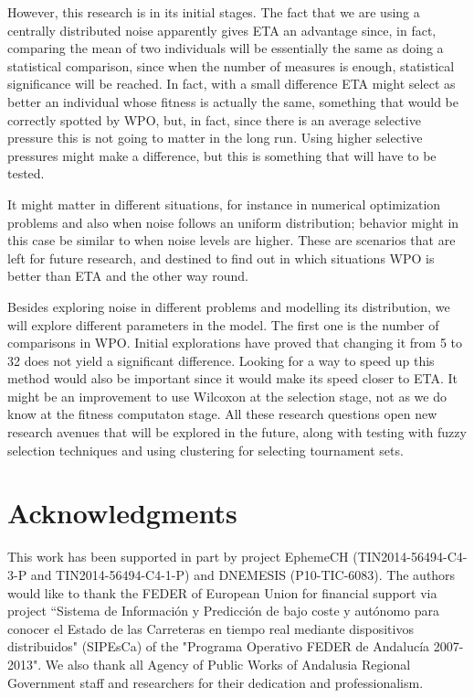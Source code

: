 \documentclass{svmult}
\begin{document}
However, this research is in its initial stages. 
The fact that we are
using a centrally distributed noise apparently gives ETA an advantage since, in
fact, comparing the mean of two individuals will be essentially the
same as doing a statistical comparison, since when the number of
measures is enough, statistical significance will be reached. In fact,
with a small difference ETA might select as better an individual whose
fitness is actually the same, something that would be correctly
spotted by WPO, but, in fact, since there is an average selective
pressure this is not going to matter in the long run. Using higher
selective pressures might make a difference, but this is something
that will have to be tested. 

It might matter in different situations, for instance in numerical
optimization problems and also when noise follows an uniform
distribution; behavior might in this case be similar to when noise
levels are higher. These are scenarios that are left for future
research, and destined to find out in which situations WPO is better
than ETA and the other way round. 

Besides exploring noise in different problems and modelling its
distribution, we will explore different parameters in the model. The first one is the number of comparisons in WPO. Initial
explorations have proved that changing it from 5 to 32 does not yield
a significant difference. Looking for a way to speed up this method
would also be important since it would make its speed closer to
ETA. It might be an improvement to use Wilcoxon at the selection
stage, not as we do know at the fitness computaton stage. All these
research questions open new research avenues that will be explored in
the future, along with testing with fuzzy selection techniques and
using clustering for selecting tournament sets. 


\section*{Acknowledgments} %

This work has been supported in part by project EphemeCH
(TIN2014-56494-C4-3-P and TIN2014-56494-C4-1-P) and DNEMESIS (P10-TIC-6083).
The authors would like to thank the FEDER of European Union for
financial support via project ``Sistema de Informaci\'on y Predicci\'on de
bajo coste y aut\'onomo para conocer el Estado de las Carreteras en
tiempo real mediante dispositivos distribuidos" (SIPEsCa) of the
"Programa Operativo FEDER de Andaluc\'ia 2007-2013". We also thank all
Agency of Public Works of Andalusia Regional Government staff and
researchers for their dedication and professionalism.
\end{document}
